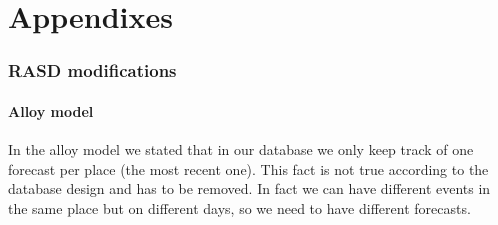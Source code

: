 \documentclass[10pt,a4paper,titlepage]{article}
\begin{document}
\part{Appendixes}
\label{part:appendixes}
\section{RASD modifications}
\subsection{Alloy model}
In the alloy model we stated that in our database we only keep track of one forecast per place (the most recent one). This fact is not true according to the database design and has to be removed. In fact we can have different events in the same place but on different days, so we need to have different forecasts.

\clearpage
\tableofcontents
\end{document}
